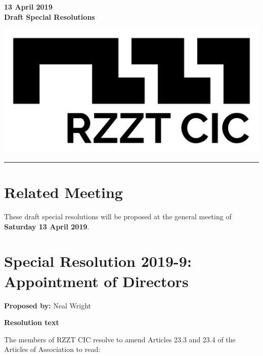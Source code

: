 \documentclass[a4paper,10pt]{article}
\begin{document}
\thispagestyle{firstpage}

\begin{minipage}[b]{0.75\textwidth}
  \textbf{13 April 2019}\\
  \LARGE{\textbf{Draft Special Resolutions}}
  \vspace{0.05em}
\end{minipage}
%
\begin{minipage}[b]{0.25\textwidth}
  \raggedleft
  \includegraphics[width=1\textwidth]{logo-black.jpg}
\end{minipage}

\hrule

\vspace{2em}


\section{Related Meeting}

These draft special resolutions will be proposed at the general meeting of \textbf{Saturday 13 April 2019}.

\section{Special Resolution 2019-9: Appointment of Directors}

\textbf{Proposed by:} Neal Wright

\textbf{Resolution text}

The members of RZZT CIC resolve to amend Articles 23.3 and 23.4 of the Articles of Association to read:
\end{document}
